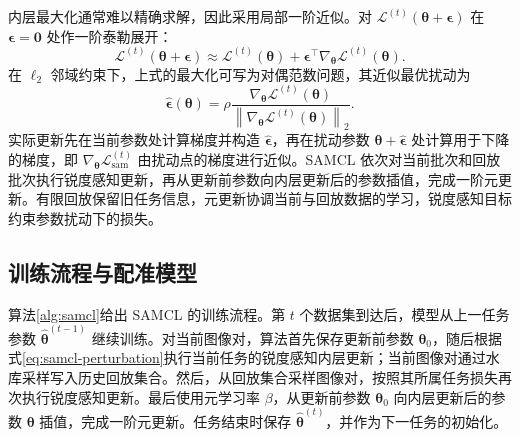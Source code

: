内层最大化通常难以精确求解，因此采用局部一阶近似。对
$\mathcal{L}^{(t)}(\boldsymbol{\theta}+\boldsymbol{\epsilon})$
在 $\boldsymbol{\epsilon}=\boldsymbol{0}$ 处作一阶泰勒展开：
\begin{equation}
\mathcal{L}^{(t)}(\boldsymbol{\theta}+\boldsymbol{\epsilon})
\approx
\mathcal{L}^{(t)}(\boldsymbol{\theta})
+
\boldsymbol{\epsilon}^{\top}
\nabla_{\boldsymbol{\theta}}
\mathcal{L}^{(t)}(\boldsymbol{\theta}).
\label{eq:samcl-taylor}
\end{equation}
在 $\ell_2$ 邻域约束下，上式的最大化可写为对偶范数问题，其近似最优扰动为
\begin{equation}
\widehat{\boldsymbol{\epsilon}}(\boldsymbol{\theta})
=
\rho
\frac{
\nabla_{\boldsymbol{\theta}}
\mathcal{L}^{(t)}(\boldsymbol{\theta})
}{
\left\|
\nabla_{\boldsymbol{\theta}}
\mathcal{L}^{(t)}(\boldsymbol{\theta})
\right\|_2
}.
\label{eq:samcl-perturbation}
\end{equation}
实际更新先在当前参数处计算梯度并构造
$\widehat{\boldsymbol{\epsilon}}$，再在扰动参数
$\boldsymbol{\theta}+\widehat{\boldsymbol{\epsilon}}$
处计算用于下降的梯度，即
$\nabla_{\boldsymbol{\theta}}\mathcal{L}^{(t)}_{\mathrm{sam}}$
由扰动点的梯度进行近似。SAMCL 依次对当前批次和回放批次执行锐度感知更新，再从更新前参数向内层更新后的参数插值，完成一阶元更新。有限回放保留旧任务信息，元更新协调当前与回放数据的学习，锐度感知目标约束参数扰动下的损失。

\subsection{训练流程与配准模型}
\label{subsec:samcl-algorithm}

算法\ref{alg:samcl}给出 SAMCL 的训练流程。第 $t$ 个数据集到达后，模型从上一任务参数
$\widehat{\boldsymbol{\theta}}^{(t-1)}$ 继续训练。对当前图像对，算法首先保存更新前参数 $\boldsymbol{\theta}_0$，随后根据式\eqref{eq:samcl-perturbation}执行当前任务的锐度感知内层更新；当前图像对通过水库采样写入历史回放集合。然后，从回放集合采样图像对，按照其所属任务损失再次执行锐度感知更新。最后使用元学习率 $\beta$，从更新前参数 $\boldsymbol{\theta}_0$ 向内层更新后的参数 $\boldsymbol{\theta}$ 插值，完成一阶元更新。任务结束时保存
$\widehat{\boldsymbol{\theta}}^{(t)}$，并作为下一任务的初始化。

